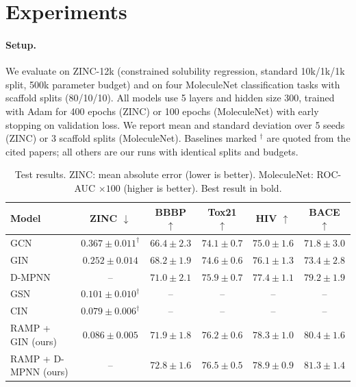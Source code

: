 \documentclass[11pt]{article}
\begin{document}
\section{Experiments}

\paragraph{Setup.} We evaluate on ZINC-12k \cite{irwin2012,dwivedi2023} (constrained solubility regression, standard 10k/1k/1k split, 500k parameter budget) and on four MoleculeNet classification tasks \cite{wu2018} with scaffold splits (80/10/10). All models use 5 layers and hidden size 300, trained with Adam for 400 epochs (ZINC) or 100 epochs (MoleculeNet) with early stopping on validation loss. We report mean and standard deviation over 5 seeds (ZINC) or 3 scaffold splits (MoleculeNet). Baselines marked $^\dagger$ are quoted from the cited papers; all others are our runs with identical splits and budgets.

\begin{table}[t]
\centering
\caption{Test results. ZINC: mean absolute error (lower is better). MoleculeNet: ROC-AUC $\times 100$ (higher is better). Best result in bold.}
\label{tab:results}
\small
\begin{tabular}{@{}lccccc@{}}
\toprule
Model & ZINC $\downarrow$ & BBBP $\uparrow$ & Tox21 $\uparrow$ & HIV $\uparrow$ & BACE $\uparrow$ \\
\midrule
GCN \cite{kipf2017}            & $0.367 \pm 0.011^\dagger$ & $66.4 \pm 2.3$ & $74.1 \pm 0.7$ & $75.0 \pm 1.6$ & $71.8 \pm 3.0$ \\
GIN \cite{xu2019}              & $0.252 \pm 0.014$ & $68.2 \pm 1.9$ & $74.6 \pm 0.6$ & $76.1 \pm 1.3$ & $73.4 \pm 2.8$ \\
D-MPNN \cite{yang2019}         & --                & $71.0 \pm 2.1$ & $75.9 \pm 0.7$ & $77.4 \pm 1.1$ & $79.2 \pm 1.9$ \\
GSN \cite{bouritsas2023}       & $0.101 \pm 0.010^\dagger$ & -- & -- & -- & -- \\
CIN \cite{bodnar2021}          & $\mathbf{0.079 \pm 0.006}^\dagger$ & -- & -- & -- & -- \\
\midrule
RAMP + GIN (ours)              & $0.086 \pm 0.005$ & $71.9 \pm 1.8$ & $76.2 \pm 0.6$ & $78.3 \pm 1.0$ & $80.4 \pm 1.6$ \\
RAMP + D-MPNN (ours)           & --                & $\mathbf{72.8 \pm 1.6}$ & $\mathbf{76.5 \pm 0.5}$ & $\mathbf{78.9 \pm 0.9}$ & $\mathbf{81.3 \pm 1.4}$ \\
\bottomrule
\end{tabular}
\end{table}
\end{document}
